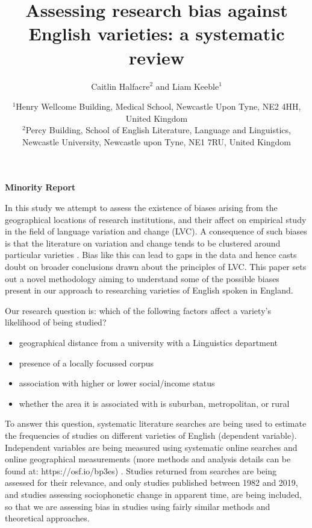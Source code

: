 \documentclass[12pt,a4paper]{article}
\title{Assessing research bias against English varieties: a systematic review}
\author{Caitlin Halfacre$^{2}$ and Liam Keeble$^{1}$}
\date{$^{1}$Henry Wellcome Building, Medical School, Newcastle Upon Tyne, NE2 4HH, United Kingdom\\
$^{2}$Percy Building, School of English Literature, Language and Linguistics, Newcastle University, Newcastle upon Tyne, NE1 7RU, United Kingdom\\}
\newcommand{\todocontentinline}[1]{\todo[color=RoyalPurple,inline]{#1}}
\begin{document}
\begin{center}
	\textbf{Minority Report}\\
\end{center}

\todocontentinline{Current word count 297}

In this study we attempt to assess the existence of biases arising from the geographical locations of research institutions, and their affect on empirical study in the field of language variation and change (LVC).  
A consequence of such biases is that the literature on variation and change tends to be clustered around particular varieties \cite{Trudgill2002}. Bias like this can lead to gaps in the data and hence casts doubt on broader conclusions drawn about the principles of LVC. This paper sets out a novel methodology aiming to understand some of the possible biases present in our approach to researching varieties of English spoken in England. 
	
Our research question is: which of the following factors affect a variety's likelihood of being studied?
	\begin{itemize}
		\item geographical distance from a university with a Linguistics department
		\item presence of a locally focussed corpus
		\item association with higher or lower social/income status
		\item whether the area it is associated with is suburban, metropolitan, or rural
	\end{itemize}


To answer this question, systematic literature searches \cite{lefebvre2019searching} are being used to estimate the frequencies of studies on different varieties of English (dependent variable). Independent variables are being measured using systematic online searches and online geographical measurements (more methods and analysis details can be found at: https://osf.io/bp3es) . Studies returned from searches are being assessed for their relevance, and only studies published between 1982 \citep{Wells1982b} and 2019, and studies assessing sociophonetic change in apparent time, are being included, so that we are assessing bias in studies using fairly similar methods and theoretical approaches.


\end{document}
